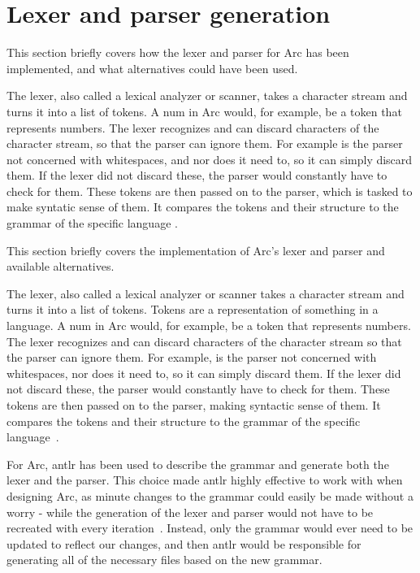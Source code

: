 \section{Lexer and parser generation}\label{sec:lexerandparsergen}
This section briefly covers how the lexer and parser for Arc has been implemented, and what alternatives could have been used.

The lexer, also called a lexical analyzer or scanner, takes a character stream and turns it into a list of tokens. A num in Arc would, for example, be a token that represents numbers. The lexer recognizes and can discard characters of the character stream, so that the parser can ignore them. For example is the parser not concerned with whitespaces, and nor does it need to, so it can simply discard them. If the lexer did not discard these, the parser would constantly have to check for them. These tokens are then passed on to the parser, which is tasked to make syntatic sense of them. It compares the tokens and their structure to the grammar of the specific language .

This section briefly covers the implementation of Arc's lexer and parser and available alternatives.

The lexer, also called a lexical analyzer or scanner takes a character stream and turns it into a list of tokens. Tokens are a representation of something in a language. A num in Arc would, for example, be a token that represents numbers. The lexer recognizes and can discard characters of the character stream so that the parser can ignore them. For example, is the parser not concerned with whitespaces, nor does it need to, so it can simply discard them. If the lexer did not discard these, the parser would constantly have to check for them. These tokens are then passed on to the parser, making syntactic sense of them. It compares the tokens and their structure to the grammar of the specific language~\cite{Parr2014}.

For Arc, \gls{antlr} has been used to describe the grammar and generate both the lexer and the parser. This choice made \gls{antlr} highly effective to work with when designing Arc, as minute changes to the grammar could easily be made without a worry - while the generation of the lexer and parser would not have to be recreated with every iteration~\cite{Parr2014}. Instead, only the grammar would ever need to be updated to reflect our changes, and then \gls{antlr}  would be responsible for generating all of the necessary files based on the new grammar.

